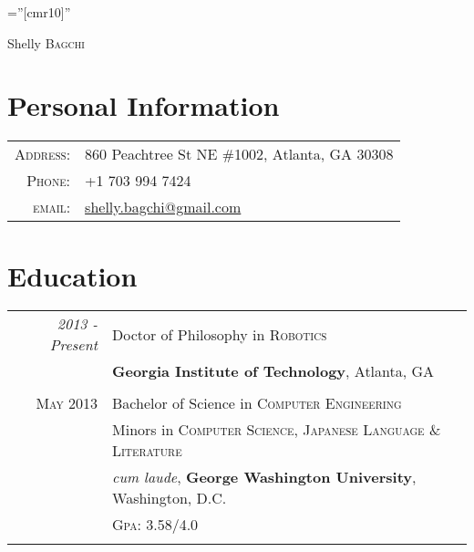 \documentclass[a4paper,10pt]{article}
\begin{document}

\pagestyle{empty} %

\font\fb=''[cmr10]'' %

\par{\centering
		{\Huge Shelly \textsc{Bagchi}
	}\bigskip\par}

\section{Personal Information}

\begin{tabular}{rl}
    \textsc{Address:}   & 860 Peachtree St NE \#1002, Atlanta, GA 30308 \\
    \textsc{Phone:}     & +1 703 994 7424\\
    \textsc{email:}     & \href{mailto:shelly.bagchi@gmail.com}{shelly.bagchi@gmail.com}
\end{tabular}

\section{Education}
\begin{tabular}{rl}	
 \emph{2013 - Present} & Doctor of Philosophy in \textsc{Robotics}\\
& \textbf{Georgia Institute of Technology}, Atlanta, GA\\
&\\
\textsc{May 2013} & Bachelor of Science in \textsc{Computer Engineering} \\
& \small Minors in \textsc{Computer Science, Japanese Language \& Literature} \\
& \emph{cum laude}, \normalsize\textbf{George Washington University}, Washington, D.C.\\
& \normalsize \textsc{Gpa}: 3.58/4.0\\&\\
\end{tabular}
\end{document}
